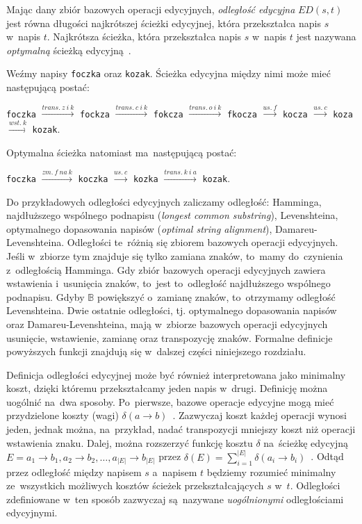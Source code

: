 \documentclass{praca1}
\begin{document}
\begin{definition}
Mając dany zbiór bazowych operacji edycyjnych, \emph{odległość edycyjna} $ED(s,t)$ jest równa długości najkrótszej ścieżki edycyjnej, która przekształca napis $s$ w~napis $t$. Najkrótsza ścieżka, która przekształca napis $s$ w~napis $t$ jest nazywana \emph{optymalną} ścieżką edycyjną~\cite{Boytsov2011:indexingmethods}. 
\end{definition}

\begin{example}
Weźmy napisy \verb|foczka| oraz \verb|kozak|. Ścieżka edycyjna między nimi może mieć następującą postać:

\verb|foczka|  $\xrightarrow{trans.\ z\ i\ k}$ \verb|fockza| $\xrightarrow{trans.\ c\ i\ k}$ \verb|fokcza| $\xrightarrow{trans.\ o\ i\ k}$ \verb|fkocza| $\xrightarrow{us.\ f}$ \verb|kocza| $\xrightarrow{us.\ c}$ \verb|koza| $\xrightarrow{wst.\ k}$ \verb|kozak|.

Optymalna ścieżka natomiast ma~następującą postać:

\verb|foczka| $\xrightarrow{zm.\ f\ na\ k}$ \verb|koczka|  $\xrightarrow{us.\ c}$ \verb|kozka| $\xrightarrow{trans.\ k\ i\ a}$ \verb|kozak|.

\end{example}

Do przykładowych odległości edycyjnych zaliczamy odległość: Hamminga, najdłuższego wspólnego podnapisu (\emph{longest common substring}), Levenshteina, optymalnego dopasowania napisów (\emph{optimal string alignment}), Damareu-Levenshteina. Odległości te~różnią się zbiorem bazowych operacji edycyjnych. Jeśli w~zbiorze tym znajduje się tylko zamiana znaków, to~mamy do~czynienia z~odległością Hamminga. Gdy zbiór bazowych operacji edycyjnych zawiera wstawienia i~usunięcia znaków, to~jest to~odległość najdłuższego wspólnego podnapisu. Gdyby $\mathbb{B}$ powiększyć o~zamianę znaków, to~otrzymamy odległość Levenshteina. Dwie ostatnie odległości, tj. optymalnego dopasowania napisów oraz Damareu-Levenshteina, mają w~zbiorze bazowych operacji edycyjnych usunięcie, wstawienie, zamianę oraz transpozycję znaków. Formalne definicje powyższych funkcji znajdują się w~dalszej części niniejszego rozdziału.




Definicja odległości edycyjnej może być również interpretowana jako minimalny koszt, dzięki któremu przekształcamy jeden napis w~drugi. Definicję można uogólnić na~dwa sposoby. Po~pierwsze, bazowe operacje edycyjne mogą mieć przydzielone koszty (wagi) $\delta(a \rightarrow b)$~\cite{Wagner1974:stringtostring}. Zazwyczaj koszt każdej operacji wynosi jeden, jednak można, na~przykład, nadać transpozycji mniejszy koszt niż operacji wstawienia znaku. Dalej, można rozszerzyć funkcję kosztu $\delta$ na~ścieżkę edycyjną $E = a_1 \rightarrow b_1, a_2 \rightarrow b_2, \ldots, a_{|E|} \rightarrow b_{|E|}$ przez $\delta(E) = \sum\limits_{i=1}^{|E|}\delta(a_i \rightarrow b_i)$~\cite{Boytsov2011:indexingmethods}. Odtąd przez odległość między napisem $s$ a~napisem $t$ będziemy rozumieć minimalny ze~wszystkich możliwych kosztów ścieżek przekształcających $s$ w~$t$. Odległości zdefiniowane w~ten sposób zazwyczaj są~nazywane \emph{uogólnionymi} odległościami edycyjnymi.
\end{document}
